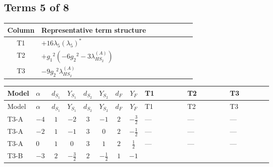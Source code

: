 \documentclass[8pt]{article}
\begin{document}
\begin{landscape}
\subsection*{Terms 5 of 8}
\begin{center}
\begin{tabular}{@{}c >{\raggedright\arraybackslash}p{0.82\linewidth}@{}}
\toprule
Column & Representative term structure \\
\midrule
T1 & \(\displaystyle +16 {\lambda_5} \left({\lambda_5}\right)^{*}\) \\
\midrule
T2 & \(\displaystyle +{g_1}^2 \left(-6 {g_2}^2-3 {\lambda_{HS_2}^{(A)}}\right)\) \\
\midrule
T3 & \(\displaystyle -9 {g_2}^2 {\lambda_{HS_2}^{(A)}}\) \\
\midrule
\bottomrule
\end{tabular}
\end{center}
\smallskip
\tiny
\begin{longtable}{@{}llcccccc >{\raggedright\arraybackslash}p{0.21\linewidth} >{\raggedright\arraybackslash}p{0.21\linewidth} >{\raggedright\arraybackslash}p{0.21\linewidth}@{}}
\toprule
Model & $\alpha$ & $d_{S_1}$ & $Y_{S_1}$ & $d_{S_2}$ & $Y_{S_2}$ & $d_F$ & $Y_F$ & T1 & T2 & T3 \\
\midrule
\endfirsthead
\toprule
Model & $\alpha$ & $d_{S_1}$ & $Y_{S_1}$ & $d_{S_2}$ & $Y_{S_2}$ & $d_F$ & $Y_F$ & T1 & T2 & T3 \\
\midrule
\endhead
T3-A & $-4$ & $1$ & $-2$ & $3$ & $-1$ & $2$ & $-\frac{3}{2}$ & --- & --- & --- \\
\midrule
T3-A & $-2$ & $1$ & $-1$ & $3$ & $0$ & $2$ & $-\frac{1}{2}$ & --- & --- & --- \\
\midrule
T3-A & $0$ & $1$ & $0$ & $3$ & $1$ & $2$ & $\frac{1}{2}$ & --- & --- & --- \\
\midrule
T3-B & $-3$ & $2$ & $-\frac{3}{2}$ & $2$ & $-\frac{1}{2}$ & $1$ & $-1$ & \scriptsize\adjustbox{max width=\linewidth}{$\begin{gathered} +16 {\lambda_5} \left({\lambda_5}\right)^{*}\end{gathered}$} & \scriptsize\adjustbox{max width=\linewidth}{$\begin{gathered} +{g_1}^2 \left(-6 {g_2}^2-3 {\lambda_{HS_2}^{(A)}}\right)\end{gathered}$} & \scriptsize\adjustbox{max width=\linewidth}{$\begin{gathered} -9 {g_2}^2 {\lambda_{HS_2}^{(A)}}\end{gathered}$} \\

\end{longtable}
\end{landscape}
\end{document}

